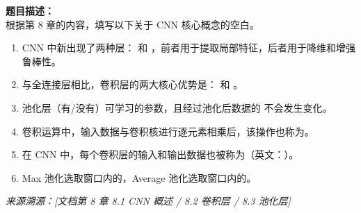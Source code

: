 \documentclass[a4paper,11pt]{ctexart}
\begin{document}
\begin{problembox}
    \textbf{题目描述：}\\
    根据第 8 章的内容，填写以下关于 CNN 核心概念的空白。

    \vspace{0.3cm}
    \begin{enumerate}[(1)]
        \item CNN 中新出现了两种层：\underline{\hspace{3cm}} 和 \underline{\hspace{3cm}}，前者用于提取局部特征，后者用于降维和增强鲁棒性。
        \item 与全连接层相比，卷积层的两大核心优势是：\underline{\hspace{3cm}} 和 \underline{\hspace{3cm}}。
        \item 池化层\underline{\hspace{1.5cm}}（有/没有）可学习的参数，且经过池化后数据的\underline{\hspace{3cm}} 不会发生变化。
        \item 卷积运算中，输入数据与卷积核进行逐元素相乘后\underline{\hspace{3cm}}，该操作也称为\underline{\hspace{3cm}}。
        \item 在 CNN 中，每个卷积层的输入和输出数据也被称为\underline{\hspace{3cm}}（英文：\underline{\hspace{3cm}}）。
        \item Max 池化选取窗口内的\underline{\hspace{2cm}}，Average 池化选取窗口内的\underline{\hspace{2cm}}。
    \end{enumerate}

    \vspace{0.2cm}
    {\color{gray}\small\textit{来源溯源：[文档第 8 章 8.1 CNN 概述 / 8.2 卷积层 / 8.3 池化层]}}
\end{problembox}
\end{document}
